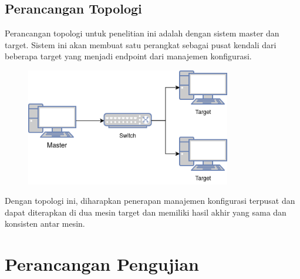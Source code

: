 \documentclass[10pt,twoside]{report}
\begin{document}
\begin{adjustwidth}{20pt}{}
	\subsection{Perancangan Topologi}
	\begin{adjustwidth}{20pt}{}
		\hspace\parindent
		Perancangan topologi untuk penelitian ini adalah dengan sistem master dan
		target. Sistem ini akan membuat satu perangkat sebagai pusat kendali dari
		beberapa target yang menjadi endpoint dari manajemen konfigurasi.\\
		\begin{figure}[H]
			\centering
			\includegraphics[width=0.8\textwidth]{images/base-topology.png}
		\end{figure}
		Dengan topologi ini, diharapkan penerapan manajemen konfigurasi terpusat
		dan dapat diterapkan di dua mesin target dan memiliki hasil akhir yang sama
		dan konsisten antar mesin.
	\end{adjustwidth}
\end{adjustwidth}
\section{Perancangan Pengujian}
\end{document}
